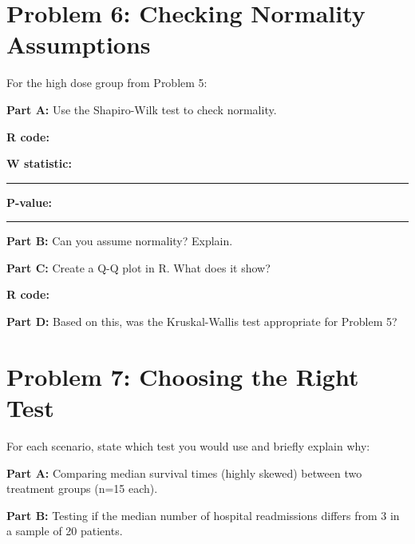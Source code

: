 \documentclass[11pt]{article}
\begin{document}
\vspace{1.5cm}

\newpage

\section{Problem 6: Checking Normality Assumptions}

For the high dose group from Problem 5:

\vspace{6pt}

\textbf{Part A:} Use the Shapiro-Wilk test to check normality.

\textbf{R code:}

\vspace{2.5cm}

\textbf{W statistic:} \rule{3cm}{0.4pt} \quad \textbf{P-value:} \rule{3cm}{0.4pt}

\vspace{0.3cm}

\textbf{Part B:} Can you assume normality? Explain.

\vspace{1.5cm}

\textbf{Part C:} Create a Q-Q plot in R. What does it show?

\textbf{R code:}

\vspace{2.5cm}

\textbf{Part D:} Based on this, was the Kruskal-Wallis test appropriate for Problem 5?

\vspace{1.5cm}

\newpage

\section{Problem 7: Choosing the Right Test}

For each scenario, state which test you would use and briefly explain why:

\vspace{6pt}

\textbf{Part A:} Comparing median survival times (highly skewed) between two treatment groups (n=15 each).

\vspace{1.5cm}

\textbf{Part B:} Testing if the median number of hospital readmissions differs from 3 in a sample of 20 patients.
\end{document}
